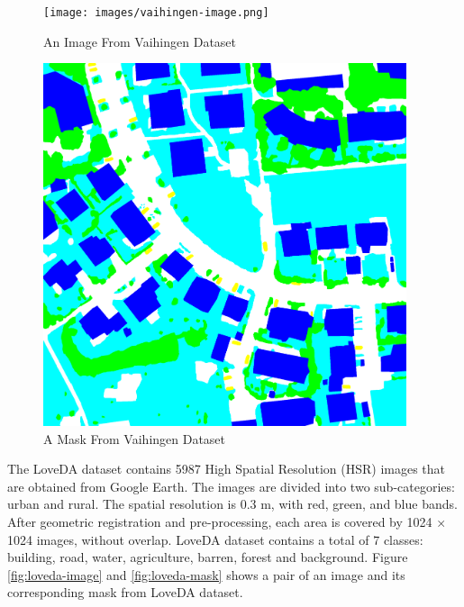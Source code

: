 \begin{figure}[!htb]
    \centering
    \begin{minipage}{0.5\textwidth}
        \centering
        \texttt{[image: images/vaihingen-image.png]}
        \caption{An Image From Vaihingen Dataset \protect\cite{potsdam-vaihingen}}
        \label{fig:vaihingen-image}
    \end{minipage}\hfill
    \begin{minipage}{0.5\textwidth}
        \centering
        \includegraphics[width=0.95\textwidth, height=0.35\textheight]{images/vaihingen-mask.png}
\centering
\caption{A Mask From Vaihingen Dataset \protect\cite{potsdam-vaihingen}}
\label{fig:vaihingen-mask}
    \end{minipage}
\end{figure}


\FloatBarrier


The LoveDA dataset \cite{loveda} contains 5987 High Spatial Resolution (HSR) images that are obtained from Google Earth. The images are divided into two sub-categories: urban and rural. The spatial resolution is 0.3 m, with red, green, and blue bands. After geometric registration and pre-processing, each area is covered by 1024 × 1024 images, without overlap. LoveDA dataset contains a total of 7 classes: building, road, water, agriculture, barren, forest and background. Figure \ref{fig:loveda-image} and \ref{fig:loveda-mask} shows a pair of an image and its corresponding mask from LoveDA dataset.

